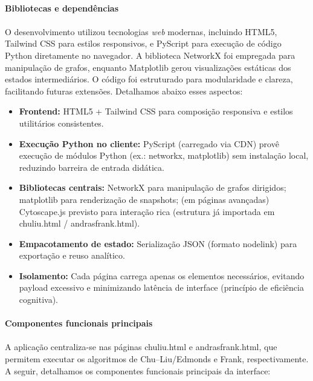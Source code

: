 \documentclass[12pt,a4paper]{article}
\def\texttt#1{#1}%
\def\emph#1{#1}%
\def\_{}%
\begin{document}
\paragraph{Bibliotecas e dependências}

\paragraph{}
O desenvolvimento utilizou tecnologias \textit{web} modernas, incluindo HTML5, Tailwind CSS para estilos responsivos, e PyScript para execução de código Python diretamente no navegador. A biblioteca NetworkX foi empregada para manipulação de grafos, enquanto Matplotlib gerou visualizações estáticas dos estados intermediários. O código foi estruturado para modularidade e clareza, facilitando futuras extensões. Detalhamos abaixo esses aspectos:

\begin{itemize}\setlength{\itemsep}{2pt}
    \item \textbf{Frontend:} HTML5 + Tailwind CSS para composição responsiva e estilos utilitários consistentes.
    \item \textbf{Execução Python no cliente:} PyScript (carregado via CDN) provê execução de módulos Python (ex.: \texttt{networkx}, \texttt{matplotlib}) sem instalação local, reduzindo barreira de entrada didática.
    \item \textbf{Bibliotecas centrais:} NetworkX para manipulação de grafos dirigidos; \texttt{matplotlib} para renderização de snapshots; (em páginas avançadas) Cytoscape.js previsto para interação rica (estrutura já importada em \texttt{chuliu.html} / \texttt{andrasfrank.html}).
    \item \textbf{Empacotamento de estado:} Serialização JSON (formato \texttt{node\_link}) para exportação e reuso analítico.
    \item \textbf{Isolamento:} Cada página carrega apenas os elementos necessários, evitando \emph{payload} excessivo e minimizando latência de interface (princípio de eficiência cognitiva).
\end{itemize}

\paragraph{Componentes funcionais principais}
\paragraph{}
A aplicação centraliza-se nas páginas \texttt{chuliu.html} e \texttt{andrasfrank.html}, que permitem executar os algoritmos de Chu--Liu/Edmonds e Frank, respectivamente. A seguir, detalhamos os componentes funcionais principais da interface:
\end{document}
